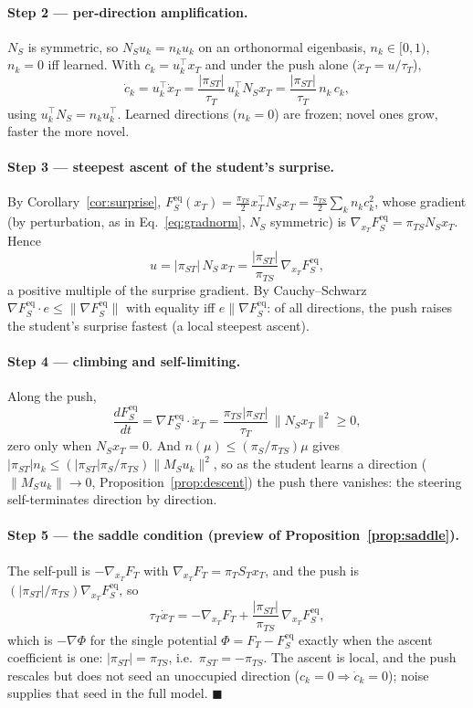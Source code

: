 \documentclass[10pt,letterpaper]{article}
\theoremstyle{plain}
\theoremstyle{remark}
\newcommand{\xT}{x_T}
\newcommand{\MS}{M_S}
\newcommand{\ST}{S_T}
\newcommand{\NS}{N_S}
\newcommand{\FSeq}{F_S^{\mathrm{eq}}}
\newcommand{\FT}{F_T}
\newcommand{\piT}{\pi_T}
\newcommand{\piS}{\pi_S}
\newcommand{\piTS}{\pi_{TS}}
\newcommand{\piST}{\pi_{ST}}
\newcommand{\tauT}{\tau_T}
\newcommand{\tr}{^{\!\top}}
\begin{document}
\paragraph{Step 2 --- per-direction amplification.} $\NS$ is symmetric, so $\NS u_k=n_k u_k$ on an
orthonormal eigenbasis, $n_k\in[0,1)$, $n_k=0$ iff learned. With $c_k=u_k\tr\xT$ and under the push
alone ($\dot\xT=u/\tauT$),
\[
\dot c_k=u_k\tr\dot\xT=\frac{|\piST|}{\tauT}\,u_k\tr\NS\xT=\frac{|\piST|}{\tauT}\,n_k\,c_k,
\]
using $u_k\tr\NS=n_k u_k\tr$. Learned directions ($n_k=0$) are frozen; novel ones grow, faster the more
novel.

\paragraph{Step 3 --- steepest ascent of the student's surprise.} By Corollary~\ref{cor:surprise},
$\FSeq(\xT)=\tfrac{\piTS}{2}\xT\tr\NS\xT=\tfrac{\piTS}{2}\sum_k n_k c_k^2$, whose gradient (by perturbation,
as in Eq.~\ref{eq:gradnorm}, $\NS$ symmetric) is $\nabla_{\xT}\FSeq=\piTS\NS\xT$. Hence
\[
u=|\piST|\,\NS\,\xT=\frac{|\piST|}{\piTS}\,\nabla_{\xT}\FSeq,
\]
a positive multiple of the surprise gradient. By Cauchy--Schwarz $\nabla\FSeq\cdot e\le\|\nabla\FSeq\|$
with equality iff $e\parallel\nabla\FSeq$: of all directions, the push raises the student's surprise
fastest (a local steepest ascent).

\paragraph{Step 4 --- climbing and self-limiting.} Along the push,
\[
\frac{d\FSeq}{dt}=\nabla\FSeq\cdot\dot\xT=\frac{\piTS|\piST|}{\tauT}\,\|\NS\xT\|^2\ge0,
\]
zero only when $\NS\xT=0$. And $n(\mu)\le(\piS/\piTS)\mu$ gives
$|\piST|n_k\le(|\piST|\piS/\piTS)\|\MS u_k\|^2$, so as the student learns a direction
($\|\MS u_k\|\to0$, Proposition~\ref{prop:descent}) the push there vanishes: the steering self-terminates
direction by direction.

\paragraph{Step 5 --- the saddle condition (preview of Proposition~\ref{prop:saddle}).} The self-pull is
$-\nabla_{\xT}\FT$ with $\nabla_{\xT}\FT=\piT\ST\xT$, and the push is $(|\piST|/\piTS)\nabla_{\xT}\FSeq$, so
\[
\tauT\dot\xT=-\nabla_{\xT}\FT+\frac{|\piST|}{\piTS}\,\nabla_{\xT}\FSeq,
\]
which is $-\nabla\Phi$ for the single potential $\Phi=\FT-\FSeq$ exactly when the ascent coefficient is
one: $|\piST|=\piTS$, i.e.\ $\piST=-\piTS$. The ascent is local, and the push rescales but does not seed
an unoccupied direction ($c_k=0\Rightarrow\dot c_k=0$); noise supplies that seed in the full model.
\hfill$\blacksquare$


\end{document}
